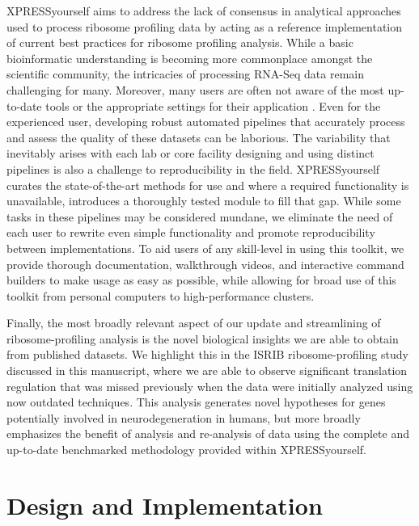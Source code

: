 \documentclass[10pt, oneside]{article}
\begin{document}
XPRESSyourself aims to address the lack of consensus in analytical approaches used to process ribosome profiling data by acting as a reference implementation of current best practices for ribosome profiling analysis. While a basic bioinformatic understanding is becoming more commonplace amongst the scientific community, the intricacies of processing RNA-Seq data remain challenging for many. Moreover, many users are often not aware of the most up-to-date tools or the appropriate settings for their application \cite{costello_npjsba, funari_science}. Even for the experienced user, developing robust automated pipelines that accurately process and assess the quality of these datasets can be laborious. The variability that inevitably arises with each lab or core facility designing and using distinct pipelines is also a challenge to reproducibility in the field. XPRESSyourself curates the state-of-the-art methods for use and where a required functionality is unavailable, introduces a thoroughly tested module to fill that gap. While some tasks in these pipelines may be considered mundane, we eliminate the need of each user to rewrite even simple functionality and promote reproducibility between implementations. To aid users of any skill-level in using this toolkit, we provide thorough documentation, walkthrough videos, and interactive command builders to make usage as easy as possible, while allowing for broad use of this toolkit from personal computers to high-performance clusters.\par

Finally, the most broadly relevant aspect of our update and streamlining of ribosome-profiling analysis is the novel biological insights we are able to obtain from published datasets. We highlight this in the ISRIB ribosome-profiling study discussed in this manuscript, where we are able to observe significant translation regulation that was missed previously when the data were initially analyzed using now outdated techniques. This analysis generates novel hypotheses for genes potentially involved in neurodegeneration in humans, but more broadly emphasizes the benefit of analysis and re-analysis of data using the complete and up-to-date benchmarked methodology provided within XPRESSyourself.\\

\section*{Design and Implementation}
\end{document}

